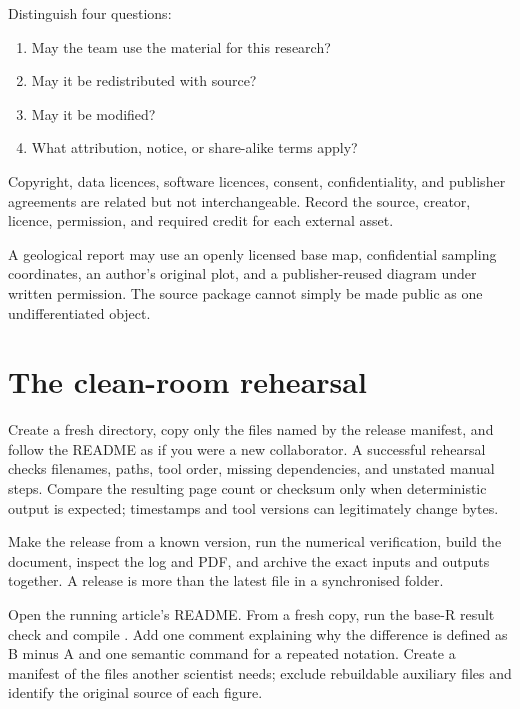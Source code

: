 Distinguish four questions:

\begin{enumerate}
  \item May the team use the material for this research?
  \item May it be redistributed with source?
  \item May it be modified?
  \item What attribution, notice, or share-alike terms apply?
\end{enumerate}

Copyright, data licences, software licences, consent, confidentiality, and
publisher agreements are related but not interchangeable. Record the source,
creator, licence, permission, and required credit for each external asset.

\begin{scienceinpractice}
A geological report may use an openly licensed base map, confidential sampling
coordinates, an author's original plot, and a publisher-reused diagram under
written permission. The source package cannot simply be made public as one
undifferentiated object.
\end{scienceinpractice}

\section{The clean-room rehearsal}

Create a fresh directory, copy only the files named by the release manifest,
and follow the README as if you were a new collaborator. A successful rehearsal
checks filenames, paths, tool order, missing dependencies, and unstated manual
steps. Compare the resulting page count or checksum only when deterministic
output is expected; timestamps and tool versions can legitimately change bytes.

\begin{goodpractice}
Make the release from a known version, run the numerical verification, build
the document, inspect the log and PDF, and archive the exact inputs and outputs
together. A release is more than the latest file in a synchronised folder.
\end{goodpractice}

\chapterproject

\begin{miniproject}
Open the running article's README. From a fresh copy, run the base-R result check
and compile . Add one comment explaining why the difference is
defined as B minus A and one semantic command for a repeated notation. Create a
manifest of the files another scientist needs; exclude rebuildable auxiliary
files and identify the original source of each figure.
\end{miniproject}

